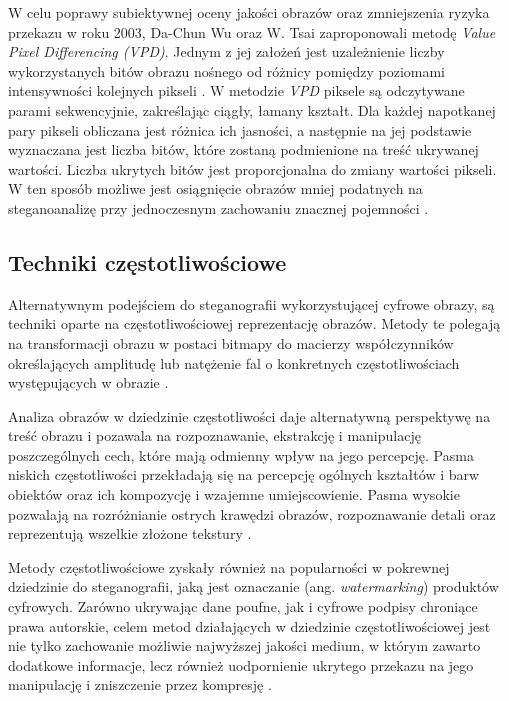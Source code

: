 {{{            %
            W celu poprawy subiektywnej oceny jakości obrazów oraz zmniejszenia ryzyka przekazu w roku 2003, Da-Chun Wu
            oraz  W. Tsai zaproponowali metodę \textit{Value Pixel Differencing \textnormal{(}VPD\textnormal{)}}. Jednym
            z jej założeń jest uzależnienie liczby wykorzystanych bitów obrazu nośnego od różnicy pomiędzy poziomami
            intensywności kolejnych  pikseli \cite{Wu2003ASM}. W metodzie \textit{VPD} piksele są odczytywane parami
            sekwencyjnie, zakreślając ciągły,  łamany kształt. Dla każdej napotkanej pary pikseli obliczana jest różnica
            ich jasności, a następnie na jej  podstawie wyznaczana jest liczba bitów, które zostaną podmienione na treść
            ukrywanej wartości. Liczba ukrytych  bitów jest proporcjonalna do zmiany wartości pikseli. W ten sposób
            możliwe jest osiągnięcie obrazów mniej  podatnych na steganoanalizę przy jednoczesnym zachowaniu znacznej
            pojemności \cite{Wu2003ASM}.

        }

        \subsection{Techniki częstotliwościowe}
        {
            Alternatywnym podejściem do steganografii wykorzystującej cyfrowe obrazy, są techniki oparte na
            częstotliwościowej reprezentację obrazów. Metody te polegają na transformacji obrazu w postaci bitmapy do
            macierzy współczynników określających amplitudę lub natężenie fal o konkretnych częstotliwościach
            występujących w obrazie \cite{ImageCompressionDCT, Reichel2001IntegerWT}.

            Analiza obrazów w dziedzinie częstotliwości daje alternatywną perspektywę na treść obrazu i pozawala na
            rozpoznawanie, ekstrakcję i manipulację poszczególnych cech, które mają odmienny wpływ na jego percepcję.
            Pasma niskich częstotliwości przekładają się na percepcję ogólnych kształtów i barw obiektów oraz ich
            kompozycję i wzajemne umiejscowienie. Pasma wysokie pozwalają na rozróżnianie ostrych krawędzi obrazów,
            rozpoznawanie detali oraz reprezentują wszelkie złożone tekstury \cite{ImageSpatialFreq}.

            Metody częstotliwościowe zyskały również na popularności w pokrewnej dziedzinie do steganografii, jaką jest
            oznaczanie (ang. \textit{watermarking}) produktów cyfrowych. Zarówno ukrywając dane poufne, jak i cyfrowe
            podpisy chroniące prawa autorskie, celem metod działających w dziedzinie częstotliwościowej jest nie tylko
            zachowanie możliwie najwyższej jakości medium, w którym zawarto dodatkowe informacje, lecz również
            uodpornienie ukrytego przekazu na jego manipulację i zniszczenie przez kompresję \cite{Tao2014RobustIW}.

}}}
